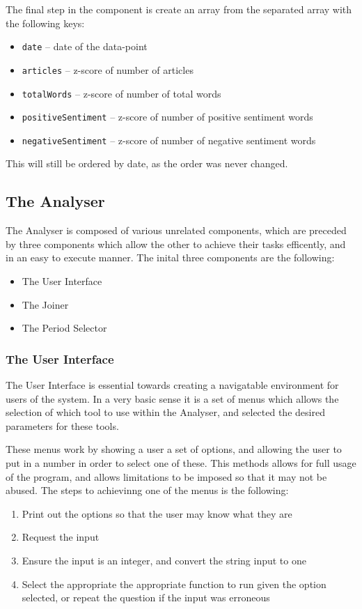 The final step in the component is create an array from the separated array with the following keys:
\begin{itemize}
    \item \texttt{date} -- date of the data-point
    \item \texttt{articles} -- z-score of number of articles
    \item \texttt{totalWords} -- z-score of number of total words
    \item \texttt{positiveSentiment} -- z-score of number of positive sentiment words
    \item \texttt{negativeSentiment} -- z-score of number of negative sentiment words
\end{itemize}
This will still be ordered by date, as the order was never changed.

\subsection{The Analyser}

The Analyser is composed of various unrelated components, which are preceded by three components which allow the other to achieve their tasks efficently, and in an easy to execute manner. The inital three components are the following: 
\begin{itemize}
    \item The User Interface
    \item The Joiner
    \item The Period Selector
\end{itemize}

\subsubsection{The User Interface}

The User Interface is essential towards creating a navigatable environment for users of the system. In a very basic sense it is a set of menus which allows the selection of which tool to use within the Analyser, and selected the desired parameters for these tools.

These menus work by showing a user a set of options, and allowing the user to put in a number in order to select one of these. This methods allows for full usage of the program, and allows limitations to be imposed so that it may not be abused. The steps to achievinng one of the menus is the following:
\begin{enumerate}
    \item Print out the options so that the user may know what they are
    \item Request the input
    \item Ensure the input is an integer, and convert the string input to one
    \item Select the appropriate the appropriate function to run given the option selected, or repeat the question if the input was erroneous
\end{enumerate}

